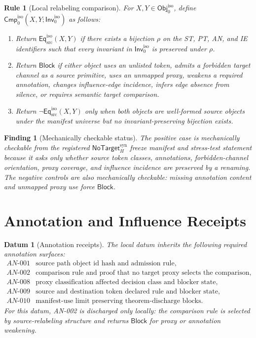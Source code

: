 \documentclass[11pt]{article}
\newcommand{\Obj}{\mathsf{Obj}_{0}^{\mathrm{iso}}}
\newcommand{\Inv}{\mathsf{Inv}_{0}^{\mathrm{iso}}}
\newcommand{\Cmp}{\mathsf{Cmp}_{0}^{\mathrm{iso}}}
\newcommand{\EqIso}{\mathsf{Eq}_{\mathrm{src}}^{\mathrm{iso}}}
\newcommand{\NoTargetSyn}{\mathsf{NoTarget}_{H}^{\mathrm{syn}}}
\newcommand{\Block}{\mathsf{Block}}
\newtheorem{datum}{Datum}
\newtheorem{ruleblock}{Rule}
\newtheorem{finding}{Finding}
\begin{document}
\begin{ruleblock}[Local relabeling comparison]
For \(X,Y\in\Obj\), define \(\Cmp(X,Y;\Inv)\) as follows:
\begin{enumerate}
    \item Return \(\EqIso(X,Y)\) if there exists a bijection \(\rho\) on
    the ST, PT, AN, and IE identifiers such that every invariant in
    \(\Inv\) is preserved under \(\rho\).
    \item Return \(\Block\) if either object uses an unlisted token,
    admits a forbidden target channel as a source primitive, uses an
    unmapped proxy, weakens a required annotation, changes influence-edge
    incidence, infers edge absence from silence, or requires semantic
    target comparison.
    \item Return \(\neg\EqIso(X,Y)\) only when both objects are well-formed
    source objects under the manifest universe but no invariant-preserving
    bijection exists.
\end{enumerate}
\end{ruleblock}

\begin{finding}[Mechanically checkable status]
The positive case is mechanically checkable from the registered
\(\NoTargetSyn\) freeze manifest and stress-test statement because it asks
only whether source token classes, annotations, forbidden-channel
orientation, proxy coverage, and influence incidence are preserved by a
renaming. The negative controls are also mechanically checkable: missing
annotation content and unmapped proxy use force \(\Block\).
\end{finding}

\section{Annotation and Influence Receipts}

\begin{datum}[Annotation receipts]
The local datum inherits the following required annotation surfaces:
\[
\begin{array}{ll}
AN\text{-}001 & \text{source path object id hash and admission rule},\\
AN\text{-}002 & \text{comparison rule and proof that no target proxy selects the comparison},\\
AN\text{-}008 & \text{proxy classification affected decision class and blocker state},\\
AN\text{-}009 & \text{source and destination token declared rule and blocker state},\\
AN\text{-}010 & \text{manifest-use limit preserving theorem-discharge blocks}.
\end{array}
\]
For this datum, AN-002 is discharged only locally: the comparison rule is
selected by source-relabeling structure and returns \(\Block\) for proxy or
annotation weakening.
\end{datum}
\end{document}
